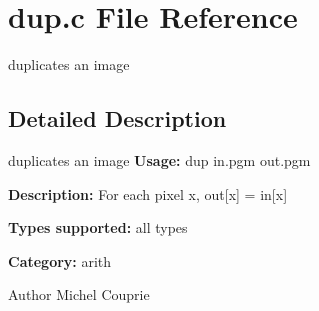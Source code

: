 \section{dup.c File Reference}
\label{dup_8c}


duplicates an image  




\subsection{Detailed Description}
duplicates an image {\bfseries Usage:} dup in.pgm out.pgm

{\bfseries Description:} For each pixel x, out[x] = in[x]

{\bfseries Types supported:} all types

{\bfseries Category:} arith

\begin{DoxyAuthor}{Author}
Michel Couprie 
\end{DoxyAuthor}
